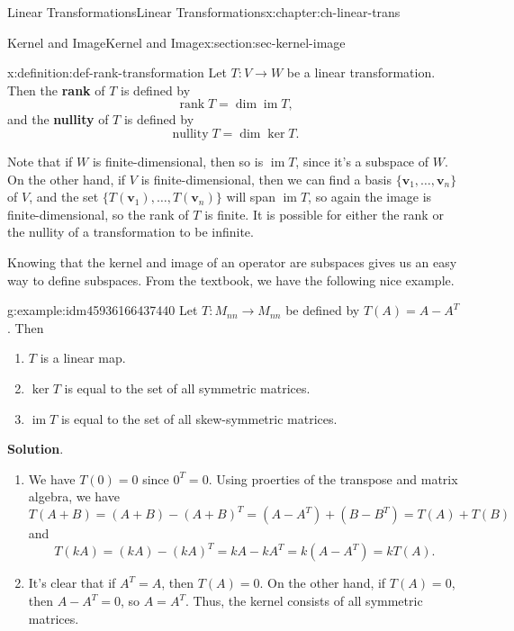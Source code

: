 \documentclass[oneside,10pt,]{book}
\newcommand{\blocktitlefont}{\relax}
\newcommand{\terminology}[1]{\textbf{#1}}
\numberwithin{equation}{section}
\newcommand{\im}{\operatorname{im}}
\newcommand{\vv}{\mathbf{v}}
\begin{document}
\begin{chapterptx}{Linear Transformations}{}{Linear Transformations}{}{}{x:chapter:ch-linear-trans}
\begin{sectionptx}{Kernel and Image}{}{Kernel and Image}{}{}{x:section:sec-kernel-image}
\begin{definition}{}{x:definition:def-rank-transformation}%
Let \(T:V\to W\) be a linear transformation. Then the \terminology{rank} of \(T\) is defined by%
\begin{equation*}
\operatorname{rank} T = \dim \im T\text{,}
\end{equation*}
and the \terminology{nullity} of \(T\) is defined by%
\begin{equation*}
\operatorname{nullity} T = \dim \ker T\text{.}
\end{equation*}
%
\end{definition}
Note that if \(W\) is finite-dimensional, then so is \(\im T\), since it's a subspace of \(W\). On the other hand, if \(V\) is finite-dimensional, then we can find a basis \(\{\vv_1,\ldots, \vv_n\}\) of \(V\), and the set \(\{T(\vv_1),\ldots, T(\vv_n)\}\) will span \(\im T\), so again the image is finite-dimensional, so the rank of \(T\) is finite. It is possible for either the rank or the nullity of a transformation to be infinite.%
\par
Knowing that the kernel and image of an operator are subspaces gives us an easy way to define subspaces. From the textbook, we have the following nice example.%
\begin{example}{}{g:example:idm45936166437440}%
Let \(T:M_{nn}\to M_{nn}\) be defined by \(T(A)=A-A^T\). Then%
\begin{enumerate}
\item{}\(T\) is a linear map.%
\item{}\(\ker T\) is equal to the set of all symmetric matrices.%
\item{}\(\im T\) is equal to the set of all skew-symmetric matrices.%
\end{enumerate}
%
\par\smallskip%
\noindent\textbf{\blocktitlefont Solution}.\label{g:solution:idm45936166431696}{}\hypertarget{g:solution:idm45936166431696}{}\quad{}%
\begin{enumerate}
\item{}We have \(T(0)=0\) since \(0^T=0\). Using proerties of the transpose and matrix algebra, we have%
\begin{equation*}
T(A+B) = (A+B)-(A+B)^T = (A-A^T)+(B-B^T) = T(A)+T(B)
\end{equation*}
and%
\begin{equation*}
T(kA) = (kA) - (kA)^T = kA-kA^T = k(A-A^T) = kT(A)\text{.}
\end{equation*}
%
\item{}It's clear that if \(A^T=A\), then \(T(A)=0\). On the other hand, if \(T(A)=0\), then \(A-A^T=0\), so \(A=A^T\). Thus, the kernel consists of all symmetric matrices.%

\end{enumerate}
\end{example}
\end{sectionptx}
\end{chapterptx}
\end{document}
